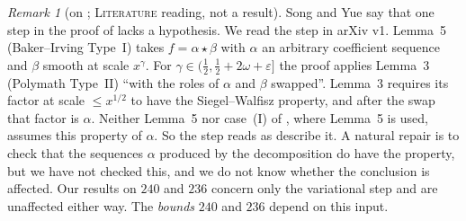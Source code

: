 \documentclass[11pt]{amsart}
\theoremstyle{definition}
\theoremstyle{remark}
\newtheorem{remark}[theorem]{Remark}
\newcommand{\lbl}[1]{\textup{\textsc{#1}}}
\begin{document}
\begin{remark}[on {\cite[Lemma~5]{Sta26}}; \lbl{Literature} reading, not a result]\label{rem:sta-lemma5}
Song and Yue \cite[Remark~4.23]{SY26} say that one step in the proof of
\cite[Lemma~5]{Sta26} lacks a hypothesis. We read the step in arXiv v1. Lemma~5
(Baker--Irving Type~I) takes $f=\alpha\star\beta$ with $\alpha$ an arbitrary
coefficient sequence and $\beta$ smooth at scale $x^\gamma$. For
$\gamma\in(\frac12,\frac12+2\omega+\varepsilon]$ the proof applies Lemma~3
(Polymath Type~II) ``with the roles of $\alpha$ and $\beta$ swapped''. Lemma~3
requires its factor at scale $\le x^{1/2}$ to have the Siegel--Walfisz
property, and after the swap that factor is $\alpha$. Neither Lemma~5 nor
case~(I) of \cite[Definition~9]{Sta26}, where Lemma~5 is used, assumes this
property of $\alpha$. So the step reads as \cite{SY26} describe it. A
natural repair is to check that the sequences $\alpha$ produced by the
decomposition do have the property, but we have not checked this, and we do
not know whether the conclusion is affected. Our results on $240$ and $236$
concern only the variational step and are unaffected either way. The
\emph{bounds} $240$ and $236$ depend on this input.
\end{remark}
\end{document}
